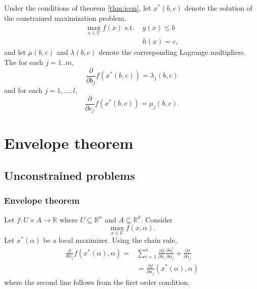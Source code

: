 \documentclass[compress]{beamer}
\def\R{\mathbb{R}}
\renewcommand{\to}{{\rightarrow}}
\begin{document}
\begin{frame}
\begin{theorem}\label{thm:muint} 
  Under the conditions of theorem \ref{thm:icon}, let $x^*(b,c)$
  denote the solution of the constrained maximization problem,
  \begin{align*}
    \max_{x \in U} f(x) \text{ s.t. } & g(x) \leq b \\
    & h(x) = c ,
  \end{align*}
  and let $\mu(b,c)$ and $\lambda(b,c)$ denote the corresponding
  Lagrange multipliers. The for each $j=1..m$,
  \[ \frac{\partial}{\partial b_j} f(x^*(b,c)) = \lambda_j(b,c) \]
  and for each $j=1,...,l$,
  \[ \frac{\partial}{\partial c_j} f(x^*(b,c)) = \mu_j(b,c). \]
\end{theorem} 
\end{frame}
\section{Envelope theorem}


\subsection{Unconstrained problems}
\begin{frame} \frametitle{Envelope theorem}
  Let $f:U \times A \to \R$ where $U \subseteq \R^n$ and $A
  \subseteq \R^k$. Consider
  \[ \max_{x \in U} f(x,\alpha). \]
  Let $x^*(\alpha)$ be a local maximizer. Using the chain rule,
  \begin{align*}
    \frac{d }{d \alpha_j} f(x^*(\alpha),\alpha) = & \sum_{i=1}^n
    \frac{\partial f}{\partial x_i} \frac{\partial x_i^*}{\partial \alpha_j}
    + \frac{\partial f}{\partial \alpha_j } \\
    & = \frac{\partial f}{\partial \alpha_j }(x^*(\alpha),\alpha)
  \end{align*}
  where the second line follows from the first order condition.
\end{frame}
\end{document}
